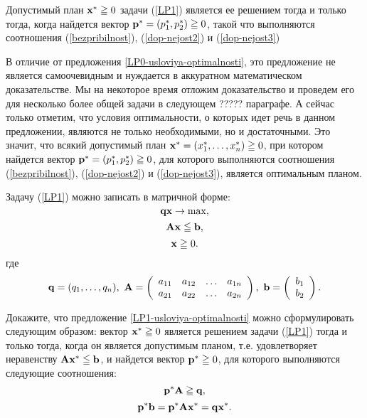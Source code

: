   \begin{prop}
    \label{LP1-usloviya-optimalnosti}
    Допустимый план $\mathbf{x^{*}}\geqq0$ задачи (\ref{LP1}) является
    ее решением тогда и только тогда, когда найдется вектор
    $\mathbf{p^{*}}=(p_{1}^{*},p_{2}^{*})\geqq0$,
    такой что выполняются соотношения (\ref{bezpribilnost}),
    (\ref{dop-nejost2}) и (\ref{dop-nejost3})
  \end{prop}

    В отличие от предложения \ref{LP0-usloviya-optimalnosti}, это
    предложение не является самоочевидным и нуждается в аккуратном
    математическом доказательстве. Мы на некоторое время отложим доказательство
    и проведем его для несколько более общей задачи в следующем ????? параграфе.
    А сейчас только отметим, что условия оптимальности, о которых идет речь в данном
    предложении, являются не только необходимыми, но и достаточными.
    Это значит, что всякий допустимый план $\mathbf{x^{*}}=(x_{1}^{*},\ldots,x_{n}^{*})\geqq0$,
    при котором найдется вектор
    $\mathbf{p^{*}}=(p_{1}^{*},p_{2}^{*})\geqq0$, для которого выполняются
    соотношения (\ref{bezpribilnost}),
    (\ref{dop-nejost2}) и (\ref{dop-nejost3}), является оптимальным
    планом.



    Задачу (\ref{LP1}) можно записать в матричной форме:
    \[\mathbf{q}\mathbf{x}\rightarrow\max,\]
    \[ \mathbf{A}\mathbf{x}\leqq \mathbf{b}, \]
    \[ \mathbf{x}\geqq0.\]
    где
    \[\mathbf{q}=(q_{1},\ldots,q_{n}), \
    \mathbf{A}=
    \left(
      \begin{array}{cccc}
        a_{11} & a_{12} & \ldots & a_{1n} \\
        a_{21} & a_{22} & \ldots & a_{2n} \\
      \end{array}
    \right), \
    \mathbf{b}=\left(
               \begin{array}{c}
                 b_{1} \\
                 b_{2} \\
               \end{array}
             \right).\]

    \begin{exer}\label{LP1-usloviya-optimalnosti-matr}
    Докажите, что предложение \ref{LP1-usloviya-optimalnosti} можно
    сформулировать следующим образом:
    вектор  $\mathbf{x^{*}}\geqq0$
    является решением задачи (\ref{LP1})
    тогда и только тогда, когда он является допустимым планом, т.е.
    удовлетворяет неравенству  $\mathbf{A}\mathbf{x^{*}}\leqq \mathbf{b}$,
    и найдется вектор $\mathbf{p^{*}}\geqq0$, для которого выполняются
    следующие соотношения:
    \[\mathbf{p^{*}}\mathbf{A}\geqq\mathbf{q},\]
    \[\mathbf{p^{*}}\mathbf{b}=\mathbf{p^{*}}\mathbf{A}\mathbf{x^{*}}=\mathbf{q}\mathbf{x^{*}}.\]
\end{exer}

